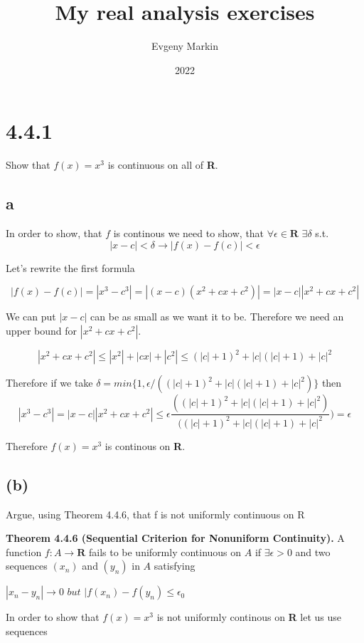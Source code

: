 \documentclass[11pt,oneside,titlepage]{article}
\title{My real analysis exercises}
\author{Evgeny Markin}
\date{2022}
\begin{document}
\maketitle

\section*{4.4.1}
Show that $f(x) = x^{3}$ is continuous on all of \textbf{R}.

\subsection*{{a}}
In order to show, that $f$ is continous we need to show, that $\forall \epsilon \in \textbf{R}$ $\exists \delta$ s.t.
$$|x - c| < \delta \to |f(x) - f(c)| < \epsilon$$

Let's rewrite the first formula

$$ |f(x) - f(c)| = |x^{3} - c^{3}| = |(x - c)(x^{2} + cx + c^{2})| = |x - c||x^{2} + cx + c^{2}|$$

We can put $|x - c|$ can be as small as we want it to be. Therefore we need an upper bound for $|x^{2} + cx + c^{2}|$.

$$|x^{2} + cx + c^{2}| \leqslant |x^{2}| + |cx| + |c^{2}| \leqslant (|c| + 1)^{2} + |c|(|c| + 1) + |c|^{2}$$



Therefore if we take
$\delta = min\{1, \epsilon/((|c| + 1)^{2} + |c|(|c| + 1) + |c|^{2})\}$
then
$$|x^3 - c^3| = |x-c||x^2 + cx + c^2| \leqslant \epsilon \frac{((|c| + 1)^{2} + |c|(|c| + 1) + |c|^{2}) }{ ((|c| + 1)^{2} + |c|(|c| + 1) + |c|^{2}}) = \epsilon$$

Therefore $f(x) = x ^3$ is continous on \textbf{R}.

\subsection*{(b)}
Argue, using Theorem 4.4.6, that f is not uniformly continuous on R


\textbf{Theorem 4.4.6 (Sequential Criterion for Nonuniform Continuity).} A function $f:A \to \textbf{R}$ fails to be uniformly continuous on $A$ if $\exists \epsilon > 0 $ and  two sequences $(x_n)$ and $(y_n)$ in $A$ satisfying

$|x_n - y_n| \to 0$ $but$ $|f(x_n) - f(y_n) \leqslant \epsilon_0$

In order to show that $f(x) = x^3$ is not uniformly continous on \textbf{R} let us use sequences
\end{document}
